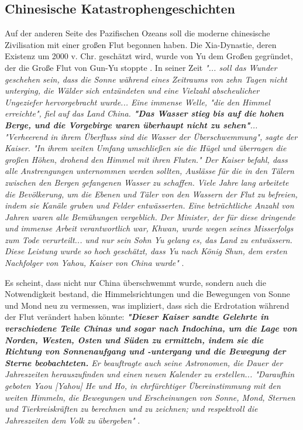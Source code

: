 \documentclass[10pt,twocolumn,letterpaper]{article}
\begin{document}
\subsection{Chinesische Katastrophengeschichten}
Auf der anderen Seite des Pazifischen Ozeans soll die moderne chinesische Zivilisation mit einer großen Flut begonnen haben. Die Xia-Dynastie, deren Existenz um 2000 v. Chr. geschätzt wird, wurde von Yu dem Großen gegründet, der die Große Flut von Gun-Yu stoppte \cite{6}. In seiner Zeit \textit{"... soll das Wunder geschehen sein, dass die Sonne während eines Zeitraums von zehn Tagen nicht unterging, die Wälder sich entzündeten und eine Vielzahl abscheulicher Ungeziefer hervorgebracht wurde... Eine immense Welle, "die den Himmel erreichte", fiel auf das Land China. \textbf{"Das Wasser stieg bis auf die hohen Berge, und die Vorgebirge waren überhaupt nicht zu sehen"}... "Verheerend in ihrem Überfluss sind die Wasser der Überschwemmung", sagte der Kaiser. "In ihrem weiten Umfang umschließen sie die Hügel und überragen die großen Höhen, drohend den Himmel mit ihren Fluten." Der Kaiser befahl, dass alle Anstrengungen unternommen werden sollten, Auslässe für die in den Tälern zwischen den Bergen gefangenen Wasser zu schaffen. Viele Jahre lang arbeitete die Bevölkerung, um die Ebenen und Täler von den Wassern der Flut zu befreien, indem sie Kanäle gruben und Felder entwässerten. Eine beträchtliche Anzahl von Jahren waren alle Bemühungen vergeblich. Der Minister, der für diese dringende und immense Arbeit verantwortlich war, Khwan, wurde wegen seines Misserfolgs zum Tode verurteilt... und nur sein Sohn Yu gelang es, das Land zu entwässern. Diese Leistung wurde so hoch geschätzt, dass Yu nach König Shun, dem ersten Nachfolger von Yahou, Kaiser von China wurde"} \cite{5}.

Es scheint, dass nicht nur China überschwemmt wurde, sondern auch die Notwendigkeit bestand, die Himmelsrichtungen und die Bewegungen von Sonne und Mond neu zu vermessen, was impliziert, dass sich die Erdrotation während der Flut verändert haben könnte: \textit{\textbf{"Dieser Kaiser sandte Gelehrte in verschiedene Teile Chinas und sogar nach Indochina, um die Lage von Norden, Westen, Osten und Süden zu ermitteln, indem sie die Richtung von Sonnenaufgang und -untergang und die Bewegung der Sterne beobachteten.} Er beauftragte auch seine Astronomen, die Dauer der Jahreszeiten herauszufinden und einen neuen Kalender zu erstellen... "Daraufhin geboten Yaou [Yahou] He und Ho, in ehrfürchtiger Übereinstimmung mit den weiten Himmeln, die Bewegungen und Erscheinungen von Sonne, Mond, Sternen und Tierkreiskräften zu berechnen und zu zeichnen; und respektvoll die Jahreszeiten dem Volk zu übergeben"} \cite{5}.
\end{document}
